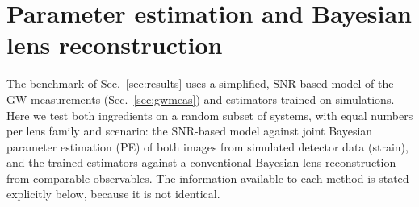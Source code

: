 \section{Parameter estimation and Bayesian lens reconstruction}
\label{sec:pe}
The benchmark of Sec.~\ref{sec:results} uses a simplified, SNR-based model of the GW measurements (Sec.~\ref{sec:gwmeas}) and estimators trained on simulations. Here we test both ingredients on a random subset of systems, with equal numbers per lens family and scenario: the SNR-based model against joint Bayesian parameter estimation (PE) of both images from simulated detector data (strain), and the trained estimators against a conventional Bayesian lens reconstruction from comparable observables. The information available to each method is stated explicitly below, because it is not identical.

